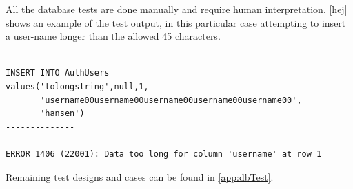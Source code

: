 All the database tests are done manually and require human interpretation. \autoref{hej} shows an example of the test output, in this particular case attempting
to insert a user-name longer than the allowed 45 characters. 


\begin{Code}
\begin{lstlisting}[label=hej,caption=Test case output]
--------------
INSERT INTO AuthUsers
values('tolongstring',null,1,
       'username00username00username00username00username00',
       'hansen')
--------------

ERROR 1406 (22001): Data too long for column 'username' at row 1
\end{lstlisting}
\end{Code}

Remaining test designs and cases can be found in \ref{app:dbTest}.